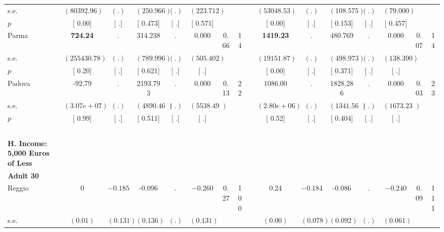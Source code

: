 \begin{longtable}{L{8em} c c c c c c c p{1em} c c c c c c c}
\quad \quad \quad \quad s.e.& $ ( 80392.96)$ & $ (        .)$ & $ (  250.966)$ & $ (        .)$ & $ (  223.712)$ & & & & $ ( 53048.53)$ & $ (        .)$ & $ (  108.575)$ & $ (        .)$ & $ (   79.000)$ & &  \\*
\quad \quad \quad \quad $ p$ & [     0.00] & [        .] & [    0.473] & [        .] & [    0.571] & & & & [     0.00] & [        .] & [    0.153] & [        .] & [    0.457] & &  \\[1em]
\quad \quad \quad Parma& \textbf{   724.24} &         . &   314.238 &         . &     0.000 &      0.66 &        14 & & \textbf{  1419.23} &         . &   480.769 &         . &     0.000 &      0.07 &        14  \\*
\quad \quad \quad \quad s.e.& $ (255430.78)$ & $ (        .)$ & $ (  789.996)$ & $ (        .)$ & $ (  505.402)$ & & & & $ ( 19151.87)$ & $ (        .)$ & $ (  498.973)$ & $ (        .)$ & $ (  138.390)$ & &  \\*
\quad \quad \quad \quad $ p$ & [     0.20] & [        .] & [    0.621] & [        .] & [        .] & & & & [     0.00] & [        .] & [    0.371] & [        .] & [        .] & &  \\[1em]
\quad \quad \quad Padova& -92.79 &         . &  2193.793 &         . &     0.000 &      0.13 &        22 & & 1086.00 &         . &  1828.286 &         . &     0.000 &      0.03 &        23  \\*
\quad \quad \quad \quad s.e.& $ ( 3.07e+07)$ & $ (        .)$ & $ ( 4890.467)$ & $ (        .)$ & $ ( 5538.494)$ & & & & $ ( 2.80e+06)$ & $ (        .)$ & $ ( 1341.569)$ & $ (        .)$ & $ ( 1673.231)$ & &  \\*
\quad \quad \quad \quad $ p$ & [     0.99] & [        .] & [    0.511] & [        .] & [        .] & & & & [     0.52] & [        .] & [    0.404] & [        .] & [        .] & &  \\[1em]
~\\[1em]
\textbf{H. Income: 5,000 Euros of Less} \\*
\quad \quad \textbf{Adult 30} & & & & & & & & & & & & & & & \\* 
\quad \quad \quad Reggio& 0 & $ \mathbf{   -0.185}$ &    -0.096 &         . & $ \mathbf{   -0.260}$ &      0.27 &       100 & & 0.24 & $ \mathbf{   -0.184}$ &    -0.086 &         . & $ \mathbf{   -0.240}$ &      0.09 &       111  \\*
\quad \quad \quad \quad s.e.& $ (     0.01)$ & $ (    0.131)$ & $ (    0.136)$ & $ (        .)$ & $ (    0.131)$ & & & & $ (     0.00)$ & $ (    0.078)$ & $ (    0.092)$ & $ (        .)$ & $ (    0.061)$ & &  \\*

\end{longtable}

